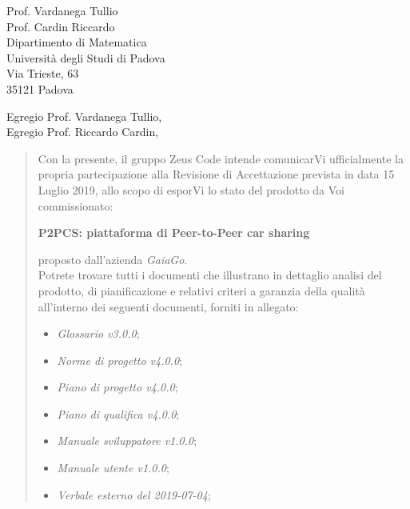 \begin{letter}{
		Prof. Vardanega Tullio \\
		Prof. Cardin Riccardo \\
		Dipartimento di Matematica \\
		Università degli Studi di Padova \\
		Via Trieste, 63 \\
		35121 Padova}
		
\opening{Egregio Prof. Vardanega Tullio,\\Egregio Prof. Riccardo Cardin,}

\begin{quotation}
Con la presente, il gruppo Zeus Code intende comunicarVi ufficialmente la propria partecipazione alla Revisione di Accettazione prevista in data 15 Luglio 2019, allo scopo di esporVi lo stato del prodotto
da Voi commissionato:

\begin{center}
	\textbf{P2PCS: piattaforma di Peer-to-Peer car sharing}
\end{center}

\noindent proposto dall'azienda \textit{GaiaGo}.\\
Potrete trovare tutti i documenti che illustrano in dettaglio analisi del prodotto, di pianificazione e relativi criteri a garanzia della qualità all'interno dei seguenti 
documenti, forniti in allegato:

\bigskip

\begin{itemize}
	
	\item \textit{Glossario v3.0.0};
	
	\item \textit{Norme di progetto v4.0.0};

	\item \textit{Piano di progetto v4.0.0};

	\item \textit{Piano di qualifica v4.0.0};
	
	\item \textit{Manuale sviluppatore v1.0.0};
	
	\item \textit{Manuale utente v1.0.0};


	\item \textit{Verbale esterno del 2019-07-04};
	

\end{itemize}
\end{quotation}
\end{letter}
